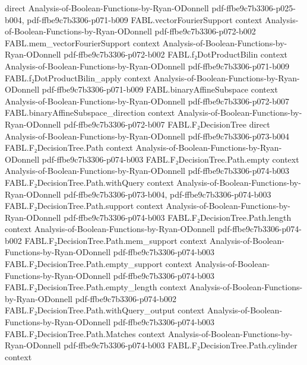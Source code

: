 \begin{theorem}
  {direct}
  {Analysis-of-Boolean-Functions-by-Ryan-ODonnell}
  {pdf-ffbe9c7b3306-p025-b004,
    pdf-ffbe9c7b3306-p071-b009}
\proofstep
  {FABL.vectorFourierSupport}
  {context}
  {Analysis-of-Boolean-Functions-by-Ryan-ODonnell}
  {pdf-ffbe9c7b3306-p072-b002}
\proofstep
  {FABL.mem_vectorFourierSupport}
  {context}
  {Analysis-of-Boolean-Functions-by-Ryan-ODonnell}
  {pdf-ffbe9c7b3306-p072-b002}
\proofstep
  {FABL.f₂DotProductBilin}
  {context}
  {Analysis-of-Boolean-Functions-by-Ryan-ODonnell}
  {pdf-ffbe9c7b3306-p071-b009}
\proofstep
  {FABL.f₂DotProductBilin_apply}
  {context}
  {Analysis-of-Boolean-Functions-by-Ryan-ODonnell}
  {pdf-ffbe9c7b3306-p071-b009}
\proofstep
  {FABL.binaryAffineSubspace}
  {context}
  {Analysis-of-Boolean-Functions-by-Ryan-ODonnell}
  {pdf-ffbe9c7b3306-p072-b007}
\proofstep
  {FABL.binaryAffineSubspace_direction}
  {context}
  {Analysis-of-Boolean-Functions-by-Ryan-ODonnell}
  {pdf-ffbe9c7b3306-p072-b007}
\proofstep
  {FABL.F₂DecisionTree}
  {direct}
  {Analysis-of-Boolean-Functions-by-Ryan-ODonnell}
  {pdf-ffbe9c7b3306-p073-b004}
\proofstep
  {FABL.F₂DecisionTree.Path}
  {context}
  {Analysis-of-Boolean-Functions-by-Ryan-ODonnell}
  {pdf-ffbe9c7b3306-p074-b003}
\proofstep
  {FABL.F₂DecisionTree.Path.empty}
  {context}
  {Analysis-of-Boolean-Functions-by-Ryan-ODonnell}
  {pdf-ffbe9c7b3306-p074-b003}
\proofstep
  {FABL.F₂DecisionTree.Path.withQuery}
  {context}
  {Analysis-of-Boolean-Functions-by-Ryan-ODonnell}
  {pdf-ffbe9c7b3306-p073-b004,
    pdf-ffbe9c7b3306-p074-b003}
\proofstep
  {FABL.F₂DecisionTree.Path.support}
  {context}
  {Analysis-of-Boolean-Functions-by-Ryan-ODonnell}
  {pdf-ffbe9c7b3306-p074-b003}
\proofstep
  {FABL.F₂DecisionTree.Path.length}
  {context}
  {Analysis-of-Boolean-Functions-by-Ryan-ODonnell}
  {pdf-ffbe9c7b3306-p074-b002}
\proofstep
  {FABL.F₂DecisionTree.Path.mem_support}
  {context}
  {Analysis-of-Boolean-Functions-by-Ryan-ODonnell}
  {pdf-ffbe9c7b3306-p074-b003}
\proofstep
  {FABL.F₂DecisionTree.Path.empty_support}
  {context}
  {Analysis-of-Boolean-Functions-by-Ryan-ODonnell}
  {pdf-ffbe9c7b3306-p074-b003}
\proofstep
  {FABL.F₂DecisionTree.Path.empty_length}
  {context}
  {Analysis-of-Boolean-Functions-by-Ryan-ODonnell}
  {pdf-ffbe9c7b3306-p074-b002}
\proofstep
  {FABL.F₂DecisionTree.Path.withQuery_output}
  {context}
  {Analysis-of-Boolean-Functions-by-Ryan-ODonnell}
  {pdf-ffbe9c7b3306-p074-b003}
\proofstep
  {FABL.F₂DecisionTree.Path.Matches}
  {context}
  {Analysis-of-Boolean-Functions-by-Ryan-ODonnell}
  {pdf-ffbe9c7b3306-p074-b003}
\proofstep
  {FABL.F₂DecisionTree.Path.cylinder}
  {context}

\end{theorem}
